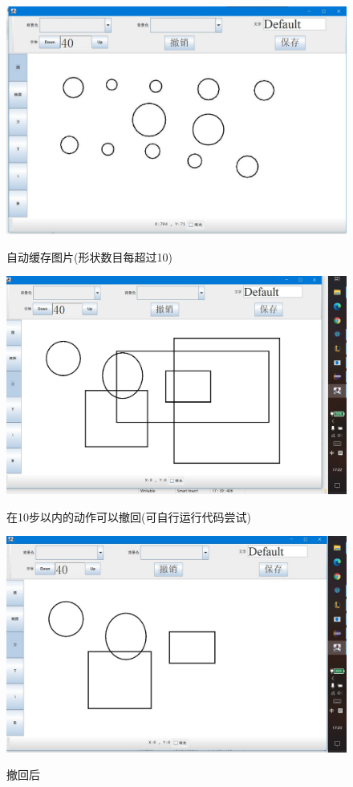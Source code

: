 \documentclass{ctexart}
\begin{document}
\begin{figure}[htbp]
    \centering
    \caption{自动缓存图片(形状数目每超过10)}
    \includegraphics[scale = 0.4]{7.jpg}
    \label{fig:7}
\end{figure}
\begin{figure}[htbp]
    \centering
    \caption{在10步以内的动作可以撤回(可自行运行代码尝试)}
    \includegraphics[scale = 0.4]{8.jpg}
    \label{fig:8}
\end{figure}
\begin{figure}[htbp]
    \centering
    \caption{撤回后}
    \includegraphics[scale = 0.4]{9.jpg}
    \label{fig:9}
\end{figure}
\end{document}
